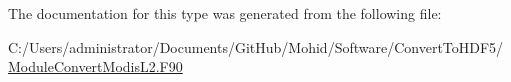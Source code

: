 The documentation for this type was generated from the following file\+:\begin{DoxyCompactItemize}
\item 
C\+:/\+Users/administrator/\+Documents/\+Git\+Hub/\+Mohid/\+Software/\+Convert\+To\+H\+D\+F5/\mbox{\hyperlink{_module_convert_modis_l2_8_f90}{Module\+Convert\+Modis\+L2.\+F90}}\end{DoxyCompactItemize}

